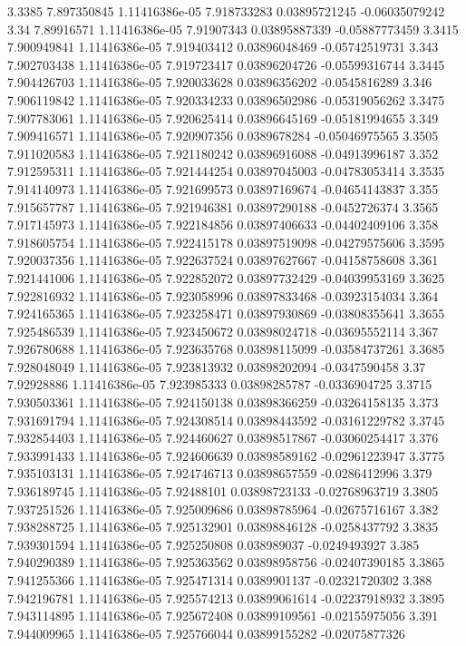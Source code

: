 {3.3385 7.897350845 1.11416386e-05 7.918733283 0.03895721245 -0.06035079242
3.34 7.89916571 1.11416386e-05 7.91907343 0.03895887339 -0.05887773459
3.3415 7.900949841 1.11416386e-05 7.919403412 0.03896048469 -0.05742519731
3.343 7.902703438 1.11416386e-05 7.919723417 0.03896204726 -0.05599316744
3.3445 7.904426703 1.11416386e-05 7.920033628 0.03896356202 -0.0545816289
3.346 7.906119842 1.11416386e-05 7.920334233 0.03896502986 -0.05319056262
3.3475 7.907783061 1.11416386e-05 7.920625414 0.03896645169 -0.05181994655
3.349 7.909416571 1.11416386e-05 7.920907356 0.0389678284 -0.05046975565
3.3505 7.911020583 1.11416386e-05 7.921180242 0.03896916088 -0.04913996187
3.352 7.912595311 1.11416386e-05 7.921444254 0.03897045003 -0.04783053414
3.3535 7.914140973 1.11416386e-05 7.921699573 0.03897169674 -0.04654143837
3.355 7.915657787 1.11416386e-05 7.921946381 0.03897290188 -0.0452726374
3.3565 7.917145973 1.11416386e-05 7.922184856 0.03897406633 -0.04402409106
3.358 7.918605754 1.11416386e-05 7.922415178 0.03897519098 -0.04279575606
3.3595 7.920037356 1.11416386e-05 7.922637524 0.03897627667 -0.04158758608
3.361 7.921441006 1.11416386e-05 7.922852072 0.03897732429 -0.04039953169
3.3625 7.922816932 1.11416386e-05 7.923058996 0.03897833468 -0.03923154034
3.364 7.924165365 1.11416386e-05 7.923258471 0.03897930869 -0.03808355641
3.3655 7.925486539 1.11416386e-05 7.923450672 0.03898024718 -0.03695552114
3.367 7.926780688 1.11416386e-05 7.923635768 0.03898115099 -0.03584737261
3.3685 7.928048049 1.11416386e-05 7.923813932 0.03898202094 -0.0347590458
3.37 7.92928886 1.11416386e-05 7.923985333 0.03898285787 -0.0336904725
3.3715 7.930503361 1.11416386e-05 7.924150138 0.03898366259 -0.03264158135
3.373 7.931691794 1.11416386e-05 7.924308514 0.03898443592 -0.03161229782
3.3745 7.932854403 1.11416386e-05 7.924460627 0.03898517867 -0.03060254417
3.376 7.933991433 1.11416386e-05 7.924606639 0.03898589162 -0.02961223947
3.3775 7.935103131 1.11416386e-05 7.924746713 0.03898657559 -0.0286412996
3.379 7.936189745 1.11416386e-05 7.92488101 0.03898723133 -0.02768963719
3.3805 7.937251526 1.11416386e-05 7.925009686 0.03898785964 -0.02675716167
3.382 7.938288725 1.11416386e-05 7.925132901 0.03898846128 -0.0258437792
3.3835 7.939301594 1.11416386e-05 7.925250808 0.038989037 -0.0249493927
3.385 7.940290389 1.11416386e-05 7.925363562 0.03898958756 -0.02407390185
3.3865 7.941255366 1.11416386e-05 7.925471314 0.0389901137 -0.02321720302
3.388 7.942196781 1.11416386e-05 7.925574213 0.03899061614 -0.02237918932
3.3895 7.943114895 1.11416386e-05 7.925672408 0.03899109561 -0.02155975056
3.391 7.944009965 1.11416386e-05 7.925766044 0.03899155282 -0.02075877326
}

